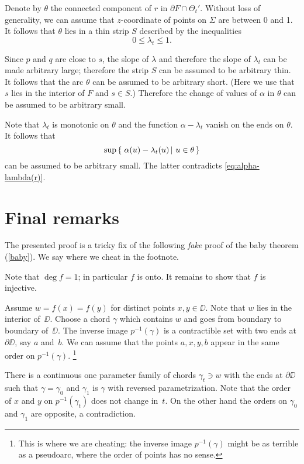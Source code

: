 \documentclass{article}
\begin{document}
Denote by $\theta$ the connected component of $r$ in $\partial F\cap \Theta_t'$.
Without loss of generality, we can assume that $z$-coordinate of points on $\Sigma$ are between 0 and 1.
It follows that $\theta$ lies in a thin strip $S$ described by the inequalities
\[0\le \lambda_t\le 1.\]

Since $p$ and $q$ are close to $s$, 
 the slope of $\lambda$ and therefore the slope of $\lambda_t$ can be made arbitrary large;
therefore the strip $S$ can be assumed to be arbitrary thin.
It follows that the arc $\theta$ can be assumed to be  arbitrary short.
(Here we use that $s$ lies in the interior of $F$ and $s\in S$.)
Therefore the change of values of $\alpha$ in $\theta$ can be assumed to be arbitrary small.

Note that $\lambda_t$ is monotonic on $\theta$ and 
the function $\alpha-\lambda_t$ vanish on the ends on $\theta$.
It follows that 
\[\sup\set{\alpha(u)-\lambda_t(u)}{u\in\theta}\]
can be assumed to be arbitrary small.
The latter contradicts \ref{eq:alpha-lambda(r)}.
\qeds

\section{Final remarks}

The presented proof is a tricky fix of the following \emph{fake} proof of the baby theorem (\ref{baby}).
We say where we cheat in the footnote.

Note that $\deg f=1$;
in particular $f$ is onto.
It remains to show that $f$ is injective.

Assume $w=f(x)=f(y)$ for distinct points $x,y\in\DD$.
Note that $w$ lies in the interior of~$\DD$.
Choose a chord $\gamma$ which contains $w$ and goes 
from boundary to boundary of~$\DD$.
The inverse image $p^{-1}(\gamma)$ is a contractible set with two ends at $\partial\DD$, say $a$ and~$b$.
We can assume that the points $a,x,y,b$ appear in the same order on $p^{-1}(\gamma)$.%
\footnote{This is where we are cheating: the inverse image $p^{-1}(\gamma)$ might be as terrible as a pseudoarc, where the order of points has no sense.}

There is a continuous one parameter family of chords $\gamma_t\ni w$ with the ends at $\partial \DD$
such that $\gamma=\gamma_0$ and $\gamma_1$ is $\gamma$ with reversed parametrization.
Note that the order of $x$ and $y$ on $p^{-1}(\gamma_t)$ does not change in~$t$.
On the other hand the orders on $\gamma_0$ and $\gamma_1$ are opposite, a contradiction.\qeds
\end{document}
